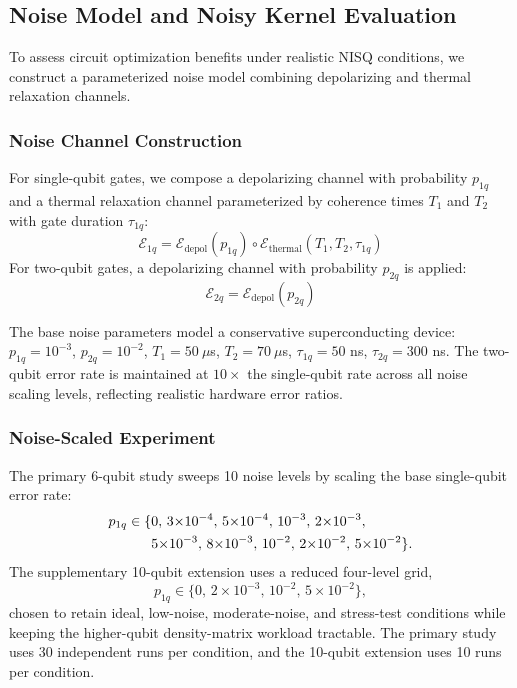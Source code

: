 \documentclass{ieeeaccess}
\begin{document}
\subsection{Noise Model and Noisy Kernel Evaluation}
\label{sec:noise_model}

To assess circuit optimization benefits under realistic NISQ conditions, we construct a parameterized noise model combining depolarizing and thermal relaxation channels.

\subsubsection{Noise Channel Construction}
For single-qubit gates, we compose a depolarizing channel with probability $p_{1q}$ and a thermal relaxation channel parameterized by coherence times $T_1$ and $T_2$ with gate duration $\tau_{1q}$:
\begin{equation}
\mathcal{E}_{1q} = \mathcal{E}_{\text{depol}}(p_{1q}) \circ \mathcal{E}_{\text{thermal}}(T_1, T_2, \tau_{1q})
\label{eq:noise_1q}
\end{equation}
For two-qubit gates, a depolarizing channel with probability $p_{2q}$ is applied:
\begin{equation}
\mathcal{E}_{2q} = \mathcal{E}_{\text{depol}}(p_{2q})
\label{eq:noise_2q}
\end{equation}

The base noise parameters model a conservative superconducting device: $p_{1q} = 10^{-3}$, $p_{2q} = 10^{-2}$, $T_1 = 50~\mu$s, $T_2 = 70~\mu$s, $\tau_{1q} = 50$ ns, $\tau_{2q} = 300$ ns. The two-qubit error rate is maintained at $10\times$ the single-qubit rate across all noise scaling levels, reflecting realistic hardware error ratios.

\subsubsection{Noise-Scaled Experiment}
The primary 6-qubit study sweeps 10 noise levels by scaling the base single-qubit error rate:
\begin{align}
p_{1q} \in \{&0,\, 3{\times}10^{-4},\, 5{\times}10^{-4},\, 10^{-3},\, 2{\times}10^{-3}, \notag \\
&5{\times}10^{-3},\, 8{\times}10^{-3},\, 10^{-2},\, 2{\times}10^{-2},\, 5{\times}10^{-2}\}. \notag
\end{align}
The supplementary 10-qubit extension uses a reduced four-level grid,
\begin{equation}
p_{1q} \in \{0,\, 2{\times}10^{-3},\, 10^{-2},\, 5{\times}10^{-2}\},
\end{equation}
chosen to retain ideal, low-noise, moderate-noise, and stress-test conditions while keeping the higher-qubit density-matrix workload tractable. The primary study uses 30 independent runs per condition, and the 10-qubit extension uses 10 runs per condition.
\end{document}
